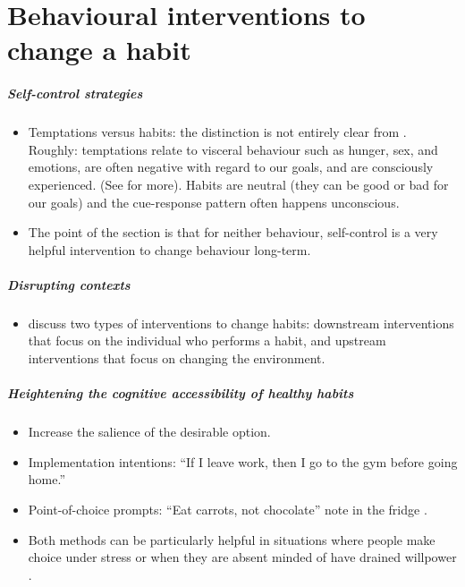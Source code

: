 \documentclass[a4paper, 11pt]{report}
\begin{document}
\chapter{Behavioural interventions to change a habit}


\paragraph{Self-control strategies}
\begin{itemize}
	\item Temptations versus habits: the distinction is not entirely clear from \citet{runger2015maintenance}. Roughly: temptations relate to visceral behaviour such as hunger, sex, and emotions, are often negative with regard to our goals, and are consciously experienced. (See \citet{loewenstein1996out} for more). Habits are neutral (they can be good or bad for our goals) and the cue-response pattern often happens unconscious.

	\item The point of the section is that for neither behaviour, self-control is a very helpful intervention to change behaviour long-term.
\end{itemize}

\paragraph{Disrupting contexts}
\begin{itemize}
	\item \citet{verplanken2006interventions} discuss two types of interventions to change habits: downstream interventions that focus on the individual who performs a habit, and upstream interventions that focus on changing the environment.
\end{itemize}

\paragraph{Heightening the cognitive accessibility of healthy habits}
\begin{itemize}
	\item Increase the salience of the desirable option.
	\item Implementation intentions: ``If I leave work, then I go to the gym before going home.'' \citep{gollwitzer2006implementation}
	\item Point-of-choice prompts: ``Eat carrots, not chocolate'' note in the fridge \citep{soler2010point}.
	\item Both methods can be particularly helpful in situations where people make choice under stress or when they are absent minded of have drained willpower \citep{salmon2014health}.
\end{itemize}
\end{document}
